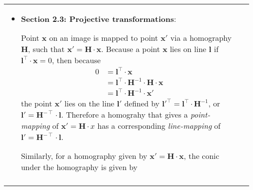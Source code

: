 \documentclass[a4paper,10pt]{article}
\begin{document}
\begin{longtable}{l p{12cm} }
{\begin{itemize}
\begin{itemize}
\begin{equation*}
\begin{split}
0&=\mathbf{x}^\intercal\cdot\mathbf{C}\cdot\mathbf{x}\\
&=\left[\begin{array}{ccc}x & y & 1\end{array} \right]\cdot
\left[\begin{array}{ccc}a & b/2 & d/2 \\ b/2 & c & e/2 \\ d/2 & e/2 & f\\\end{array}\right]\cdot\left[\begin{array}{c}x \\ y \\ 1 \end{array}\right]\\
&=a\cdot{x}^2+b\cdot{xy}+c\cdot{y}^2+d\cdot{x}+e\cdot{y}+f\cdot{1}
\end{split}
\end{equation*}
\item \textbf{Section 2.3: Projective transformations}:\newline
\par Point $\mathbf{x}$ on an image is mapped to point $\mathbf{x'}$ via a homography $\mathbf{H}$, such that $\mathbf{x'}=\mathbf{H}\cdot\mathbf{x}$. Because a point $\mathbf{x}$ lies on line $\mathbf{l}$ if $\mathbf{l}^\intercal\cdot\mathbf{x}=0$, then because 
\begin{equation*}
\begin{split}
0&=\mathbf{l}^\intercal\cdot\mathbf{x}\\
&=\mathbf{l}^\intercal\cdot\mathbf{H}^{-1}\cdot\mathbf{H}\cdot\mathbf{x}\\
&=\mathbf{l}^\intercal\cdot\mathbf{H}^{-1}\cdot\mathbf{x'}
\end{split}
\end{equation*}
the point $\mathbf{x'}$ lies on the line $\mathbf{l'}$ defined by $\mathbf{l'}^\intercal=\mathbf{l}^\intercal\cdot\mathbf{H}^{-1}$, or $\mathbf{l'}=\mathbf{H}^{-\intercal}\cdot\mathbf{l}$. Therefore a homograhy that gives a \textit{point-mapping} of $\mathbf{x'}=\mathbf{H}\cdot{x}$ has a corresponding \textit{line-mapping} of $\mathbf{l'}=\mathbf{H}^{-\intercal}\cdot\mathbf{l}$.\newline
\par Similarly, for a homography given by $\mathbf{x'}=\mathbf{H}\cdot\mathbf{x}$, the conic under the homography is given by 
\begin{equation*}
\begin{split}

\end{split}
\end{equation*}
\end{itemize}
\end{itemize}}
\end{longtable}
\end{document}

